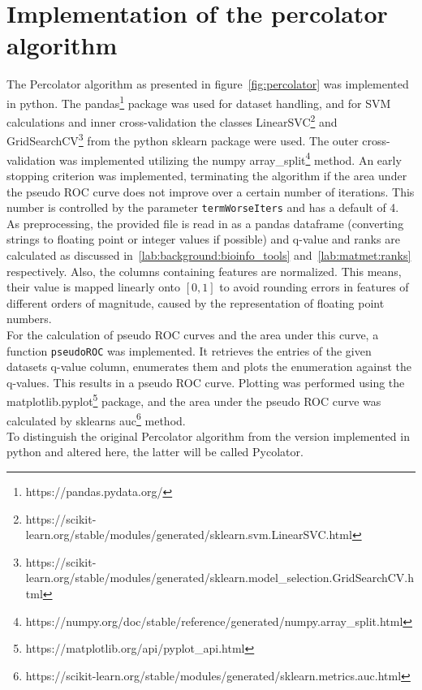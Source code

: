 \section{Implementation of the percolator algorithm}
The Percolator algorithm as presented in figure~\ref{fig:percolator} was implemented in python. The pandas\footnote{https://pandas.pydata.org/} package was used for dataset handling, and for SVM calculations and inner cross-validation the classes LinearSVC\footnote{https://scikit-learn.org/stable/modules/generated/sklearn.svm.LinearSVC.html} and GridSearchCV\footnote{https://scikit-learn.org/stable/modules/generated/sklearn.model\_selection.GridSearchCV.html} from the python sklearn package were used. The outer cross-validation was implemented utilizing the numpy array\_split\footnote{https://numpy.org/doc/stable/reference/generated/numpy.array\_split.html} method. An early stopping criterion was implemented, terminating the algorithm if the area under the pseudo ROC curve does not improve over a certain number of iterations. This number is controlled by the parameter \texttt{termWorseIters} and has a default of 4.\\
\label{lab:matmet:normalization}As preprocessing, the provided file is read in as a pandas dataframe (converting strings to floating point or integer values if possible) and q-value and ranks are calculated as discussed in~\ref{lab:background:bioinfo_tools} and~\ref{lab:matmet:ranks} respectively. Also, the columns containing features are normalized. This means, their value is mapped linearly onto $[0,1]$ to avoid rounding errors in features of different orders of magnitude, caused by the representation of floating point numbers.\\
\label{lab:matmet:pseudoROC}For the calculation of pseudo ROC curves and the area under this curve, a function \texttt{pseudoROC} was implemented. It retrieves the entries of the given datasets q-value column, enumerates them and plots the enumeration against the q-values. This results in a pseudo ROC curve. Plotting was performed using the matplotlib.pyplot\footnote{https://matplotlib.org/api/pyplot\_api.html} package, and the area under the pseudo ROC curve was calculated by sklearns auc\footnote{https://scikit-learn.org/stable/modules/generated/sklearn.metrics.auc.html} method.\\
To distinguish the original Percolator algorithm from the version implemented in python and altered here, the latter will be called Pycolator.

